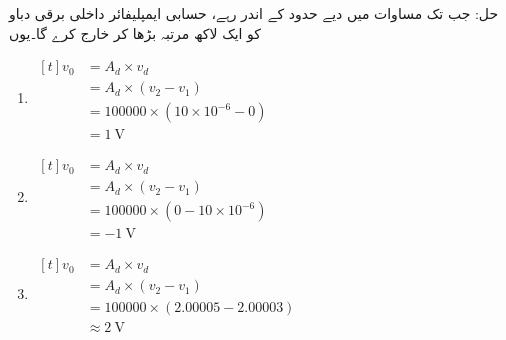 حل:	جب تک  مساوات   میں دیے حدود کے اندر رہے، حسابی ایمپلیفائر داخلی برقی دباو کو ایک لاکھ مرتبہ بڑھا کر خارج کرے گا۔یوں
\begin{enumerate}
\item $\begin{aligned}[t]
v_0 &=A_d \times v_d \\
&=A_d \times \left (v_2 - v_1 \right )\\
&=100000 \times \left(10\times 10^{-6}-0 \right )\\
&=\SI{1}{\volt}
\end{aligned}$
%
\item $\begin{aligned}[t]
v_0 &=A_d \times v_d \\
&=A_d \times \left (v_2 - v_1 \right )\\
&=100000 \times \left(0-10\times 10^{-6} \right )\\
&=\SI{-1}{\volt}
\end{aligned}$
%
\item $\begin{aligned}[t]
v_0 &=A_d \times v_d \\
&=A_d \times \left (v_2 - v_1 \right )\\
&=100000 \times \left(2.00005-2.00003 \right )\\
&\approx \SI{2}{\volt}
\end{aligned}$


\end{enumerate}
